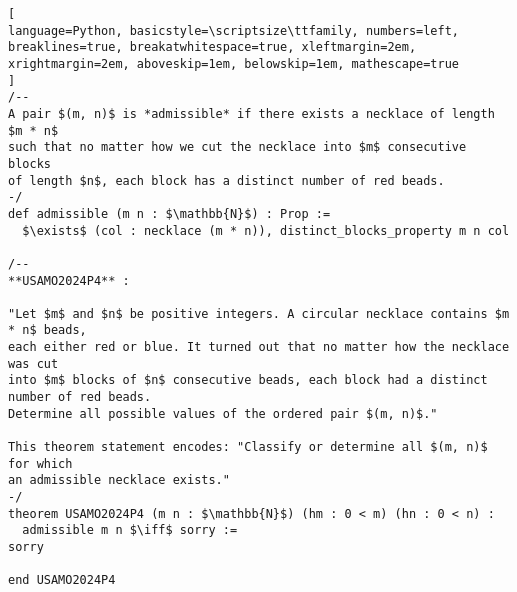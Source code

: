 \begin{tcolorbox}
\begin{lstlisting}[
language=Python, basicstyle=\scriptsize\ttfamily, numbers=left, breaklines=true, breakatwhitespace=true, xleftmargin=2em, xrightmargin=2em, aboveskip=1em, belowskip=1em, mathescape=true
]
/--
A pair $(m, n)$ is *admissible* if there exists a necklace of length $m * n$
such that no matter how we cut the necklace into $m$ consecutive blocks
of length $n$, each block has a distinct number of red beads.
-/
def admissible (m n : $\mathbb{N}$) : Prop :=
  $\exists$ (col : necklace (m * n)), distinct_blocks_property m n col

/--
**USAMO2024P4** :

"Let $m$ and $n$ be positive integers. A circular necklace contains $m * n$ beads,
each either red or blue. It turned out that no matter how the necklace was cut
into $m$ blocks of $n$ consecutive beads, each block had a distinct number of red beads.
Determine all possible values of the ordered pair $(m, n)$."

This theorem statement encodes: "Classify or determine all $(m, n)$ for which
an admissible necklace exists."
-/
theorem USAMO2024P4 (m n : $\mathbb{N}$) (hm : 0 < m) (hn : 0 < n) :
  admissible m n $\iff$ sorry :=
sorry

end USAMO2024P4
\end{lstlisting}
\end{tcolorbox}


